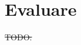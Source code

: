 \documentclass[12pt,a4paper]{report}
\providecommand{\DIFdeltex}[1]{{\protect\color{red}\sout{#1}}}                      %
\providecommand{\DIFdelbegin}{} %
\providecommand{\DIFdelend}{} %
\providecommand{\DIFdel}[1]{\texorpdfstring{\DIFdeltex{#1}}{}} %
\newcommand{\DIFscaledelfig}{0.5}
\newlength{\DIFdelgraphicswidth} %
\newlength{\DIFdelgraphicsheight} %
\newcommand{\DIFdelincludegraphics}[2][]{%
	\sbox{\DIFdelgraphicsbox}{\DIFOincludegraphics[#1]{#2}}%
	\settoboxwidth{\DIFdelgraphicswidth}{\DIFdelgraphicsbox} %
	\settoboxtotalheight{\DIFdelgraphicsheight}{\DIFdelgraphicsbox} %
	\scalebox{\DIFscaledelfig}{%
		\parbox[b]{\DIFdelgraphicswidth}{\usebox{\DIFdelgraphicsbox}\\[-\baselineskip] \rule{\DIFdelgraphicswidth}{0em}}\llap{\resizebox{\DIFdelgraphicswidth}{\DIFdelgraphicsheight}{%
				\setlength{\unitlength}{\DIFdelgraphicswidth}%
				\begin{picture}(1,1)%
				\thicklines\linethickness{2pt} %
				{\color[rgb]{1,0,0}\put(0,0){\framebox(1,1){}}}%
				{\color[rgb]{1,0,0}\put(0,0){\line( 1,1){1}}}%
				{\color[rgb]{1,0,0}\put(0,1){\line(1,-1){1}}}%
				\end{picture}%
			}\hspace*{3pt}}} %
} %
\DeclareRobustCommand{\DIFdelbegin}{\DIFOdelbegin \let\includegraphics\DIFdelincludegraphics} %
\DeclareRobustCommand{\DIFdelend}{\DIFOaddend \let\includegraphics\DIFOincludegraphics} %
\begin{document}
	\chapter{Evaluare}
	\DIFdelbegin \DIFdel{TODO:
	}\DIFdelend %
\end{document}
